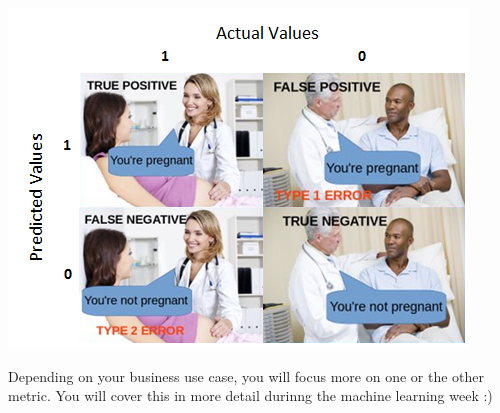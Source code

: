 \documentclass[
]{book}
\begin{document}
\includegraphics{img/conf_matrix.png}

Depending on your business use case, you will focus more on one or the other metric. You will cover this in more detail durinng the machine learning week :)

  
\end{document}
